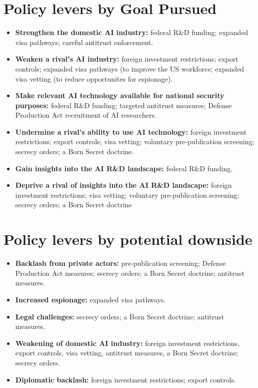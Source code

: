 \documentclass{article}
\begin{document}
\begin{multicols}{2}
\section{Policy levers by Goal Pursued}
\begin{itemize}
\item \textbf{Strengthen the domestic AI industry:} federal R\&D funding; expanded visa pathways; careful antitrust enforcement.
\item \textbf{Weaken a rival's AI industry:} foreign investment restrictions; export controls; expanded visa pathways (to improve the US workforce; expanded visa vetting (to reduce opportunites for espionage).
\item \textbf{Make relevant AI technology available for national security purposes:} federal R\&D funding; targeted antitrust measures; Defense Production Act recruitment of AI researchers.
\item \textbf{Undermine a rival’s ability to use AI technology:} foreign investment restrictions; export controls; visa vetting; voluntary pre-publication screening; secrecy orders; a Born Secret doctrine.
\item \textbf{Gain insights into the AI R\&D landscape:} federal R\&D funding.
\item \textbf{Deprive a rival of insights into the AI R\&D landscape:} foreign investment restrictions; visa vetting; voluntary pre-publication screening; secrecy orders; a Born Secret doctrine

\end{itemize}

\section{Policy levers by potential downside}
\begin{itemize}
\item \textbf{Backlash from private actors:} pre-publication screening; Defense Production Act measures; secrecy orders; a Born Secret doctrine; antitrust measures.
\item \textbf{Increased espionage:} expanded visa pathways.
\item \textbf{Legal challenges:} secrecy orders; a Born Secret doctrine; antitrust measures.
\item \textbf{Weakening of domestic AI industry:} foreign investment restrictions, export controls, visa vetting, antitrust measures, a Born Secret doctrine; secrecy orders.
\item \textbf{Diplomatic backlash:} foreign investment restrictions; export controls.


\end{itemize}
\end{multicols}
\end{document}
